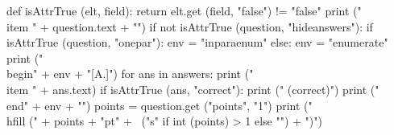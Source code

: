 \documentclass{article}
\begin{document}
\begin{enumerate}

def isAttrTrue (elt, field):
    return elt.get (field, "false") != "false"
print ("\\item " + question.text + "\n\n")
if not isAttrTrue (question, "hideanswers"):
  if isAttrTrue (question, "onepar"):
    env = "inparaenum"
  else:
    env = "enumerate"
  print ("\\begin{" + env + "}[A.]")
  for ans in answers:
    print ("\\item " + ans.text)
    if isAttrTrue (ans, "correct"):
      print (" (correct)")
  print ("\\end{" + env + "}")
points = question.get ("points", "1")
print ("\\hfill (" + points + "pt" + \
                ("s" if int (points) > 1 else "") + ")\n")

\end{enumerate}
\end{document}
